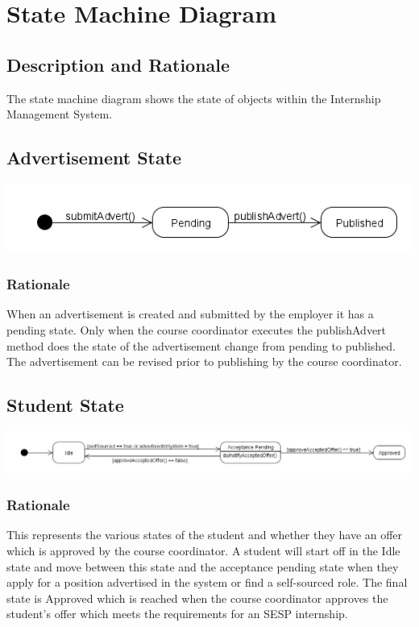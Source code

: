 \documentclass{l3deliverable}
\begin{document}
\section{State Machine Diagram}
\subsection{Description and Rationale}
The state machine diagram shows the state of objects within the Internship Management System.\\

\subsection{Advertisement State}
\includegraphics[scale = 0.5]{AdvertState.png}\\

\subsubsection{Rationale}
When an advertisement is created and submitted by the employer it has a pending state.
Only when the course coordinator executes the publishAdvert method does the state of the 
advertisement change from pending to published. The advertisement can be revised prior to
publishing by the course coordinator. \\

\subsection{Student State}
\includegraphics[scale = 0.45]{StudentState.png}\\

\subsubsection{Rationale}
This represents the various states of the student and whether they have an offer which is approved by the course coordinator.
A student will start off in the Idle state and move between this state and the acceptance pending state when they apply for a position advertised in the system
or find a self-sourced role. The final state is Approved which is reached when the course coordinator approves the student's offer which meets the requirements for an
SESP internship. \\  
\end{document}
